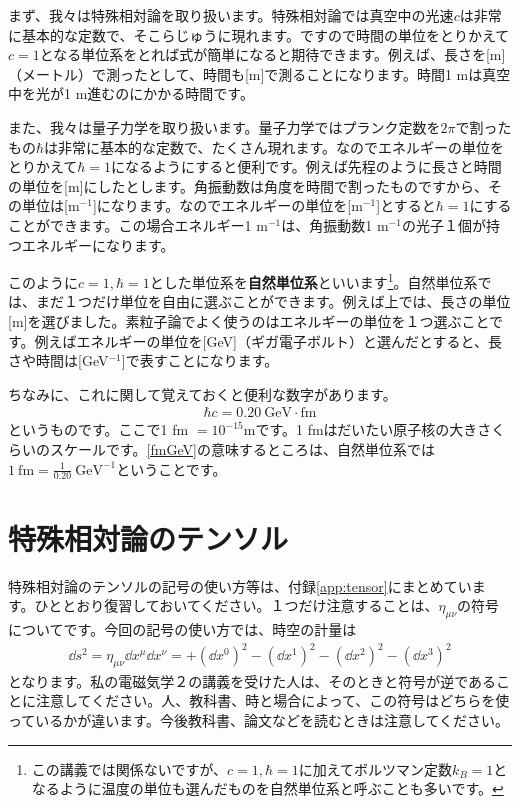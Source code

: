 \documentclass[report,paper=a4, fontsize=12pt, line_length=16cm, number_of_lines=33,dvipdfmx]{jlreq}
\numberwithin{equation}{chapter}
\newcommand{\strong}[1]{{\sffamily \bfseries #1}}
\begin{document}
まず、我々は特殊相対論を取り扱います。特殊相対論では真空中の光速$c$は非常に基本的な定数で、そこらじゅうに現れます。ですので時間の単位をとりかえて$c=1$となる単位系をとれば式が簡単になると期待できます。例えば、長さを[m]（メートル）で測ったとして、時間も[m]で測ることになります。時間1 mは真空中を光が1 m進むのにかかる時間です。

また、我々は量子力学を取り扱います。量子力学ではプランク定数を$2\pi$で割ったもの$\hbar$は非常に基本的な定数で、たくさん現れます。なのでエネルギーの単位をとりかえて$\hbar=1$になるようにすると便利です。例えば先程のように長さと時間の単位を[m]にしたとします。角振動数は角度を時間で割ったものですから、その単位は[m${}^{-1}$]になります。なのでエネルギーの単位を[m${}^{-1}$]とすると$\hbar=1$にすることができます。この場合エネルギー1 m${}^{-1}$は、角振動数1 m${}^{-1}$の光子１個が持つエネルギーになります。

このように$c=1,\hbar=1$とした単位系を\strong{自然単位系}といいます\footnote{この講義では関係ないですが、$c=1, \hbar=1$に加えてボルツマン定数$k_B=1$となるように温度の単位も選んだものを自然単位系と呼ぶことも多いです。}。自然単位系では、まだ１つだけ単位を自由に選ぶことができます。例えば上では、長さの単位[m]を選びました。素粒子論でよく使うのはエネルギーの単位を１つ選ぶことです。例えばエネルギーの単位を[GeV]（ギガ電子ボルト）と選んだとすると、長さや時間は[GeV${}^{-1}$]で表すことになります。

ちなみに、これに関して覚えておくと便利な数字があります。
\begin{align}
  \hbar c = 0.20 \mathrm{\ GeV\cdot fm}\label{fmGeV}
\end{align}
というものです。ここで1 fm $=10^{-15}$mです。1 fmはだいたい原子核の大きさくらいのスケールです。\eqref{fmGeV}の意味するところは、自然単位系では$1\ \mathrm{ fm}=\frac{1}{0.20}\ \mathrm{GeV}^{-1}$ということです。

\section{特殊相対論のテンソル}
特殊相対論のテンソルの記号の使い方等は、付録\ref{app:tensor}にまとめています。ひととおり復習しておいてください。１つだけ注意することは、$\eta_{\mu\nu}$の符号についてです。今回の記号の使い方では、時空の計量は
\begin{align}
  \dd{s}^2=\eta_{\mu\nu}\dd{x}^{\mu}\dd{x}^{\nu}=+(\dd{x}^0)^2
  -(\dd{x}^1)^2
  -(\dd{x}^2)^2
  -(\dd{x}^3)^2\label{metric}
\end{align}
となります。私の電磁気学２の講義を受けた人は、そのときと符号が逆であることに注意してください。人、教科書、時と場合によって、この符号はどちらを使っているかが違います。今後教科書、論文などを読むときは注意してください。
\end{document}
